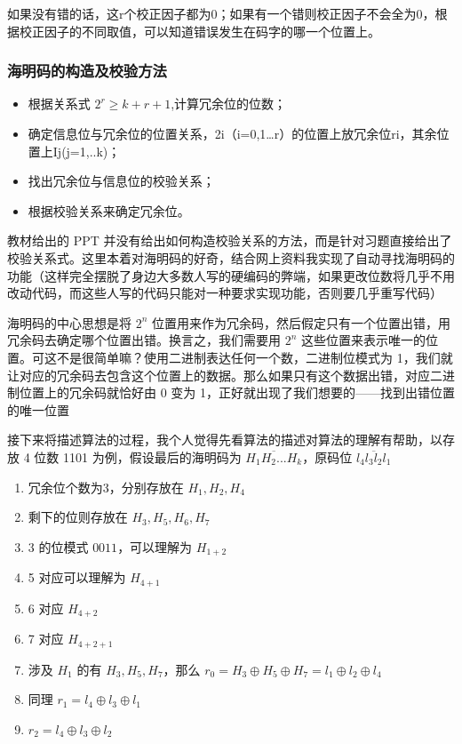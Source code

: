 \documentclass[a4paper,10pt,UTF8]{paper}
\numberwithin{equation}{section}
\numberwithin{figure}{section}
\begin{document}
如果没有错的话，这r个校正因子都为0；如果有一个错则校正因子不会全为0，根据校正因子的不同取值，可以知道错误发生在码字的哪一个位置上。

\subsubsection{海明码的构造及校验方法}


\begin{itemize}
  \item 根据关系式 $2^r \ge k+r+1$,计算冗余位的位数；
  \item 确定信息位与冗余位的位置关系，2i（i=0,1…r）的位置上放冗余位ri，其余位置上Ij(j=1,..k)；
  \item 找出冗余位与信息位的校验关系；
  \item 根据校验关系来确定冗余位。
\end{itemize}

教材给出的 PPT 并没有给出如何构造校验关系的方法，而是针对习题直接给出了校验关系式。这里本着对海明码的好奇，结合网上资料我实现了自动寻找海明码的功能（这样完全摆脱了身边大多数人写的硬编码的弊端，如果更改位数将几乎不用改动代码，而这些人写的代码只能对一种要求实现功能，否则要几乎重写代码）

海明码的中心思想是将 $2^n$ 位置用来作为冗余码，然后假定只有一个位置出错，用冗余码去确定哪个位置出错。换言之，我们需要用 $2^n$ 这些位置来表示唯一的位置。可这不是很简单嘛？使用二进制表达任何一个数，二进制位模式为 1，我们就让对应的冗余码去包含这个位置上的数据。那么如果只有这个数据出错，对应二进制位置上的冗余码就恰好由 0 变为 1，正好就出现了我们想要的——找到出错位置的唯一位置

接下来将描述算法的过程，我个人觉得先看算法的描述对算法的理解有帮助，以存放 4 位数 1101 为例，假设最后的海明码为 $\overline{H_1H_2...H_k}$，原码位 $\overline{l_4l_3l_2l_1}$


\begin{enumerate}
  \item 冗余位个数为3，分别存放在 $H_1,H_2,H_4$
  \item 剩下的位则存放在 $H_3,H_5,H_6,H_7$
  \item 3 的位模式 $0011$，可以理解为 $H_{1+2}$
  \item 5 对应可以理解为 $H_{4+1}$
  \item 6 对应 $H_{4+2}$
  \item 7 对应 $H_{4+2+1}$
  \item 涉及 $H_1$ 的有 $H_3,H_5,H_7$，那么 $r_0 = H_3 \oplus H_5 \oplus H_7 = l_1 \oplus l_2 \oplus l_4$
  \item 同理 $r_1 = l_4 \oplus l_3 \oplus l_1$
  \item $r_2 = l_4 \oplus l_3 \oplus l_2$
\end{enumerate}
\end{document}

